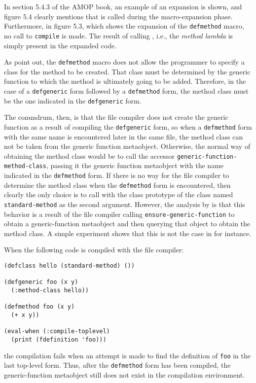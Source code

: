 In section 5.4.3 of the AMOP book, an example of an expansion is
shown, and figure 5.4 clearly mentions that \mml{} is called during
the macro-expansion phase.  Furthermore, in figure 5.3, which shows the
expansion of the \texttt{defmethod} macro, no call to \texttt{compile}
is made.  The result of calling \mml{}, i.e., the \emph{method lambda}
is simply present in the expanded code.

As \cnh{} point out, the \texttt{defmethod} macro does
not allow the programmer to specify a class for the method to be
created.  That class must be determined by the generic function to
which the method is ultimately going to be added.  Therefore, in the
case of a \texttt{defgeneric} form followed by a \texttt{defmethod}
form, the method class must be the one indicated in the
\texttt{defgeneric} form.

The conundrum, then, is that the file compiler does not create the
generic function as a result of compiling the \texttt{defgeneric}
form, so when a \texttt{defmethod} form with the same name is
encountered later in the same file, the method class can not be taken
from the generic function metaobject.  Otherwise, the normal way of
obtaining the method class would be to call the accessor
\texttt{generic-function-method-class}, passing it the generic
function metaobject with the name indicated in the \texttt{defmethod}
form.  If there is no way for the file compiler to determine the
method class when the \texttt{defmethod} form is encountered, then
clearly the only choice is to call \mml{} with the class prototype of
the class named \texttt{standard-method} as the second argument.
However, the analysis by \cnh{} is that this behavior is a result of
the file compiler calling \texttt{ensure-generic-function} to obtain a
generic-function metaobject and then querying that object to obtain
the method class.  A simple experiment shows that this is not the case
in \sbcl{} for instance.

When the following code is compiled with the \sbcl{} file compiler:

\begin{verbatim}
(defclass hello (standard-method) ())

(defgeneric foo (x y)
  (:method-class hello))

(defmethod foo (x y)
  (+ x y))

(eval-when (:compile-toplevel)
  (print (fdefinition 'foo)))
\end{verbatim}

\noindent
the compilation fails when an attempt is made to find the definition
of \texttt{foo} in the last top-level form.  Thus, after the
\texttt{defmethod} form has been compiled, the generic-function
metaobject still does not exist in the compilation environment.

